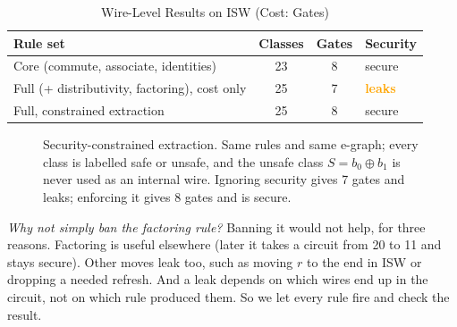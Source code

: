 \documentclass[conference]{IEEEtran}
\newcommand{\bad}{\textcolor{orange}{\textbf{leaks}}}
\newcommand{\ok}{secure}
\begin{document}
\begin{table}[t]
\caption{Wire-Level Results on ISW (Cost: Gates)}\label{tab:wire}
\centering\footnotesize
\begin{tabular}{@{}lccl@{}}
\toprule
Rule set & Classes & Gates & Security\\\midrule
Core (commute, associate, identities) & 23 & 8 & \ok\\
Full (+ distributivity, factoring), cost only & 25 & 7 & \bad\\
Full, constrained extraction & 25 & 8 & \ok\\
\bottomrule
\end{tabular}
\end{table}
\begin{figure}[!t]
\centering
{}
\caption{Security-constrained extraction. Same rules and same e-graph; every class is labelled safe or unsafe, and the unsafe class $S=b_0\oplus b_1$ is never used as an internal wire. Ignoring security gives 7 gates and leaks; enforcing it gives 8 gates and is secure.}\label{fig:repair}
\end{figure}

\emph{Why not simply ban the factoring rule?} Banning it would not help, for three reasons. Factoring is useful elsewhere (later it takes a circuit from 20 to 11 and stays secure). Other moves leak too, such as moving $r$ to the end in ISW or dropping a needed refresh. And a leak depends on which wires end up in the circuit, not on which rule produced them. So we let every rule fire and check the result.
\end{document}
